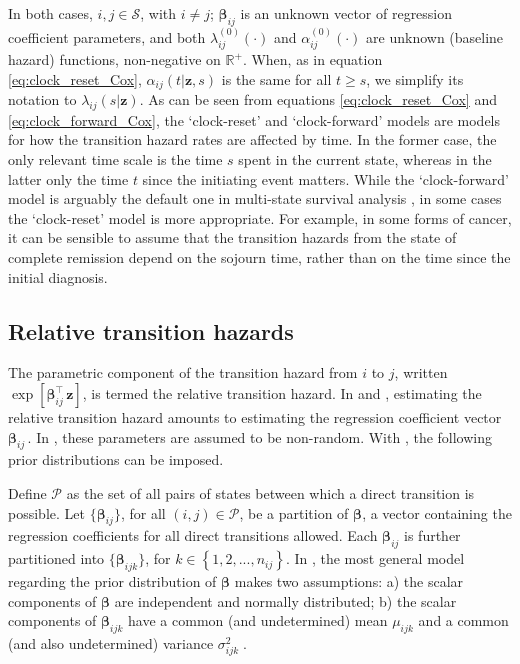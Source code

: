 In both cases, $i,j \in \mathcal{S}$, with $i\neq j$; $\boldsymbol{\beta}_{\scriptscriptstyle ij}$ is an unknown vector of regression coefficient parameters, and both $\lambda^{\scriptscriptstyle (0)}_{ij}(\cdot)$ and $\alpha^{\scriptscriptstyle (0)}_{ij}(\cdot)$ are unknown (baseline hazard) functions, non-negative on $\mathds{R}^{+}$.  When, as in equation \ref{eq:clock_reset_Cox},  $\alpha_{ij}\left(t|\mathbf{z},s\right)$ is the same for all $t\geq s$, we simplify its notation to $\lambda_{ij}\left(s|\mathbf{z}\right)$.  As can be seen from equations \ref{eq:clock_reset_Cox} and \ref{eq:clock_forward_Cox},  the `clock-reset' and `clock-forward' models are models for how the transition hazard rates are affected by time. In the former case, the only relevant time scale is the time $s$ spent in the current state, whereas in the latter only the time $t$ since the initiating event matters. 
While the `clock-forward' model is arguably the default one in multi-state survival analysis \citep{Andersen1993,Aalen2008}, in some cases the `clock-reset' model is more appropriate.  For example,  in some forms of cancer,  it can be sensible to assume that the transition hazards from the state of complete remission depend on the sojourn time, rather than on the time since the initial diagnosis.

\subsection{Relative transition hazards}
\label{sec:models_relative_hazards}
The parametric component of the transition hazard from $i$ to $j$, written $\exp\left[\boldsymbol{\beta}^{\intercal}_{ij} \,\mathbf{z}\right]$, is termed the relative transition hazard.  In  and ,  estimating the relative transition hazard amounts to estimating the regression coefficient vector $\boldsymbol{\beta}_{ij}\,$.  
In , these parameters are assumed to be non-random. With , the following prior distributions  can be imposed.

Define $\mathcal{P}$ as the set of all pairs of states between which a direct transition is possible. Let $\lbrace \boldsymbol{\beta}_{\scriptscriptstyle ij} \rbrace $, for all $(i, j) \in \mathcal{P}$, be a partition of $\boldsymbol \beta$, a vector containing the regression coefficients for all direct transitions allowed. Each $\boldsymbol{\beta}_{\scriptscriptstyle ij}$ is further partitioned into  $\lbrace \boldsymbol{\beta}_{\scriptscriptstyle ijk} \rbrace$, for $k \in \left\lbrace 1,2,...,n_{\scriptscriptstyle ij} \right\rbrace$. In , the most general model regarding the prior distribution  of $\boldsymbol{\beta}$ makes two assumptions:  a) the scalar components of $\boldsymbol{\beta}$ are independent and normally distributed; b) the scalar components of $\boldsymbol{\beta}_{\scriptscriptstyle i j k}$ have a common (and undetermined) mean $\mu_{\scriptscriptstyle ijk}$ and a common (and also undetermined) variance $\sigma^{2}_{\scriptscriptstyle ijk}\;$.

